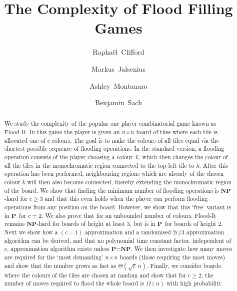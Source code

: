 \documentclass[a4paper,11pt]{llncs}
\title{The Complexity of Flood Filling Games}
\author{Rapha\"{e}l~Clifford \and  Markus~Jalsenius \and Ashley~Montanaro \and Benjamin~Sach}
\institute{Department of Computer Science, University of Bristol, UK}
\newcounter{l}
\renewcommand{\geq}{\geqslant}
\newcommand{\Ptime}{\ensuremath{\mathbf{P}}}
\newcommand{\NPtime}{\ensuremath{\mathbf{NP}}}
\newcommand{\recdim}[2]{$#1$$\mspace{1mu}$$\times$$\mspace{1mu}$$#2$}
\begin{document}
\maketitle

\begin{abstract}
We study the complexity of the popular one player combinatorial game known as Flood-It. In this game the player is given an \recdim{n}{n} board of tiles where each tile is allocated one of $c$ colours. The goal is to make the colours of all tiles equal via the shortest possible sequence of flooding operations. In the standard version, a flooding operation consists of the player choosing a colour~$k$, which then changes the colour of all the tiles in the monochromatic region connected to the top left tile to $k$. After this operation has been performed, neighbouring regions which are already of the chosen colour $k$ will then also become connected, thereby extending the monochromatic region of the board. We show that finding the minimum number of flooding operations is \NPtime-hard for $c \geq 3$ and that this even holds when the player can perform flooding operations from any position on the board. However, we show that this `free' variant is in \Ptime\ for $c=2$. We also prove that for an unbounded number of colours, Flood-It remains \NPtime-hard for boards of height at least 3, but is in \Ptime\ for boards of height 2. Next we show how a $(c-1)$ approximation and a randomised $2c/3$ approximation algorithm can be derived, and that no polynomial time constant factor, independent of $c$, approximation algorithm exists unless \Ptime=\NPtime.  We then investigate how many moves are required for the `most demanding' \recdim{n}{n} boards (those requiring the most moves) and show that the number grows as fast as $\Theta(\sqrt{c}\, n)$.    Finally, we consider boards where the colours of the tiles are chosen at random and show that for $c\geq 2$, the number of moves required to flood the whole board is $\Omega(n)$ with high probability.
\end{abstract}
\end{document}
